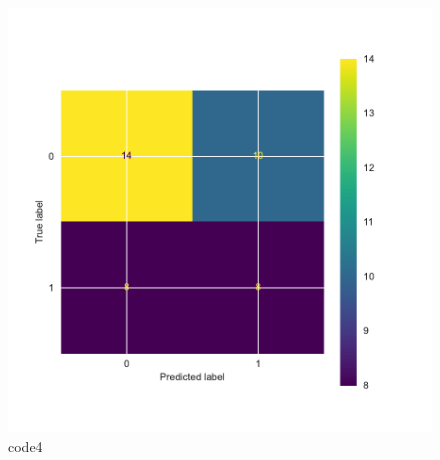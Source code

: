 \begin{PythonCode}\label{例4}
	
\end{PythonCode}

\begin{figure}[htbp]
	\centering
	\includegraphics[width=14cm]{codeimage/code4}
	\caption{code4}
	\label{code4}
\end{figure}

\begin{PythonCode}\label{例5}
	
\end{PythonCode}

\begin{PythonCode}\label{例6}
	
\end{PythonCode}

